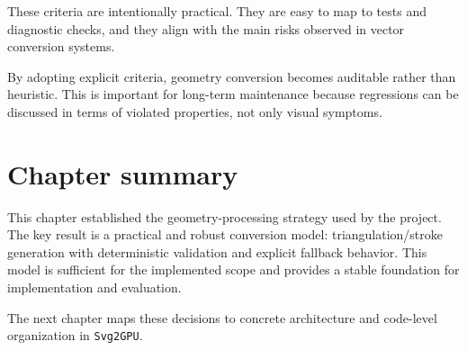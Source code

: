 These criteria are intentionally practical.
They are easy to map to tests and diagnostic checks, and they align with the main risks observed in vector conversion systems.

By adopting explicit criteria, geometry conversion becomes auditable rather than heuristic.
This is important for long-term maintenance because regressions can be discussed in terms of violated properties, not only visual symptoms.

\section{Chapter summary}

This chapter established the geometry-processing strategy used by the project.
The key result is a practical and robust conversion model: triangulation/stroke generation with deterministic validation and explicit fallback behavior.
This model is sufficient for the implemented scope and provides a stable foundation for implementation and evaluation.

The next chapter maps these decisions to concrete architecture and code-level organization in \texttt{Svg2GPU}.

